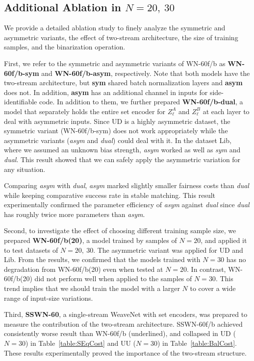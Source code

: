 \subsection{Additional Ablation in \texorpdfstring{$N=20,~30$}{N=20, 30}} 
\label{ss:exp2_supp}

We provide a detailed ablation study to finely analyze the symmetric and asymmetric variants, the effect of two-stream architecture, the size of training samples, and the binarization operation.

First, we refer to the symmetric and asymmetric variants of WN-60f/b as {\bf WN-60f/b-sym} and {\bf WN-60f/b-asym}, respectively. Note that both models have the two-stream architecture, but {\bf sym} shared batch normalization layers and {\bf asym} does not. In addition, {\bf asym} has an additional channel in inputs for side-identifiable code. 
In addition to them, we further prepared {\bf WN-60f/b-dual}, a model that separately holds the entire set encoder for $Z^A_\ell$ and $Z^B_\ell$ at each layer to deal with asymmetric inputs. 
Since UD is a highly asymmetric dataset, the symmetric variant (WN-60f/b-sym) does not work appropriately while the asymmetric variants ({\it asym} and {\it dual}) could deal with it.
In the dataset Lib, where we assumed an unknown bias strength, {\it asym} worked as well as {\it sym} and {\it dual}. This result showed that we can safely apply the asymmetric variation for any situation.

Comparing {\it asym} with {\it dual}, {\it asym} marked slightly smaller fairness costs than {\it dual} while keeping comparative success rate in stable matching.
This result experimentally confirmed the parameter efficiency of {\it asym} against {\it dual} since {\it dual} has roughly twice more parameters than {\it asym}.

Second, to investigate the effect of choosing different training sample size, we prepared {\bf WN-60f/b(20)}, a model trained by samples of $N=20$, and applied it to test datasets of $N=20,~30$. The asymmetric variant was applied for UD and Lib.
From the results, we confirmed that the models trained with $N=30$ has no degradation from WN-60f/b(20) even when tested at $N=20$. In contrast, WN-60f/b(20) did not perform well when applied to the samples of $N=30$.
This trend implies that we should train the model with a larger $N$ to cover a wide range of input-size variations.

Third, {\bf SSWN-60}, a single-stream WeaveNet with set encoders, was prepared to measure the contribution of the two-stream architecture. 
SSWN-60f/b achieved consistently worse result than WN-60f/b (underlined), and collapsed in UD ($N=30$) in Table~\ref{table:SEqCost} and UU ($N=30$) in Table~\ref{table:BalCost}.
These results experimentally proved the importance of the two-stream structure.


